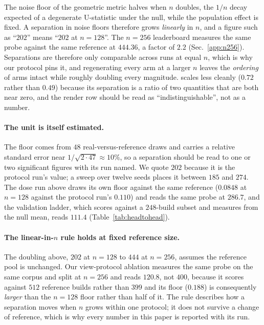 The noise floor of the geometric metric halves when $n$ doubles, the $1/n$ decay
expected of a degenerate U-statistic under the null, while the
population effect is fixed. A separation in noise floors therefore grows
\emph{linearly} in $n$, and a figure such as ``$202$'' means ``$202$ at
$n{=}128$''. The $n{=}256$ leaderboard measures the same probe against the same
reference at $444.36$, a factor of $2.2$ (Sec.~\ref{app:n256}). Separations are
therefore only comparable across runs at equal $n$, which is why our protocol
pins it, and regenerating every arm at a larger $n$ leaves the \emph{ordering} of
arms intact while roughly doubling every magnitude. \mvkid{} scales less cleanly
($0.72$ rather than $0.49$) because its separation is a ratio of two quantities
that are both near zero, and the render row should be read as
``indistinguishable'', not as a number.

\paragraph{The unit is itself estimated.} The floor comes from $48$
real-versus-reference draws and carries a relative standard error near
$1/\sqrt{2 \cdot 47} \approx 10\%$, so a separation should be read to one or two
significant figures with its run named. We quote $202$ because it is the
protocol run's value; a sweep over twelve seeds places it between $185$ and
$274$. The dose run above draws its own floor against the same reference ($0.0848$ at
$n{=}128$ against the protocol run's $0.110$) and reads the same probe at $286.7$, and the
validation ladder, which scores against a $248$-build subset and measures from the null
mean, reads $111.4$ (Table~\ref{tab:headtohead}).

\paragraph{The linear-in-$n$ rule holds at fixed reference size.} The
doubling above, $202$ at $n{=}128$ to $444$ at $n{=}256$, assumes the reference
pool is unchanged. Our view-protocol ablation measures the same probe on the
same corpus and split at $n{=}256$ and reads $120.8$, not $400$, because it
scores against $512$ reference builds rather than $399$ and its floor
($0.188$) is consequently \emph{larger} than the $n{=}128$ floor rather than
half of it. The rule describes how a separation moves when $n$ grows within one
protocol; it does not survive a change of reference, which is why every number
in this paper is reported with its run.

